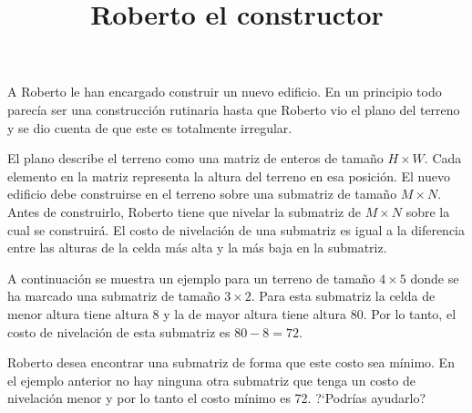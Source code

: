 \documentclass{oci}
\title{Roberto el constructor}
\begin{document}
\begin{problemDescription}
  A Roberto le han encargado construir un nuevo edificio.
  En un principio todo parecía ser una construcción rutinaria hasta que Roberto vio el plano
  del terreno y se dio cuenta de que este es totalmente irregular.

  El plano describe el terreno como una matriz de enteros de tamaño $H\times W$.
  Cada elemento en la matriz representa la altura del terreno en esa posición.
  El nuevo edificio debe construirse en el terreno sobre una submatriz de tamaño $M\times N$.
  Antes de construirlo, Roberto tiene que nivelar la submatriz de $M\times N$
  sobre la cual se construirá.
  El costo de nivelación de una submatriz es igual a la diferencia entre las alturas de la celda
  más alta y la más baja en la submatriz.

  A continuación se muestra un ejemplo para un terreno de tamaño $4\times 5$ donde se ha marcado
  una submatriz de tamaño $3\times 2$.
  Para esta submatriz la celda de menor altura tiene altura 8 y la de mayor altura tiene altura 80.
  Por lo tanto, el costo de nivelación de esta submatriz es $80 - 8=72$.

  \begin{center}
  \end{center}

  Roberto desea encontrar una submatriz de forma que este costo sea mínimo.
  En el ejemplo anterior no hay ninguna otra submatriz que tenga un costo de nivelación menor
  y por lo tanto el costo mínimo es 72.
  ?`Podrías ayudarlo?
\end{problemDescription}
\end{document}
